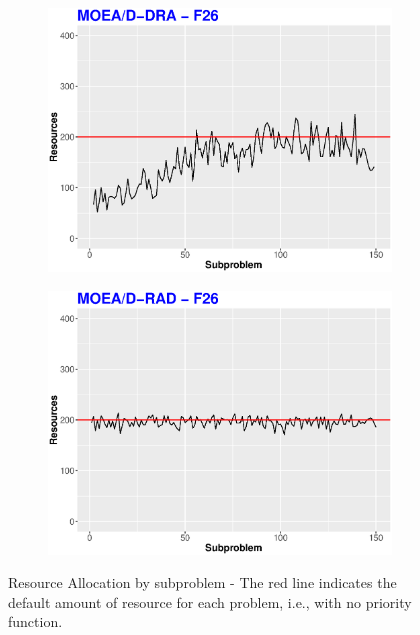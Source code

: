 \begin{figure}[!t]
	\centering
	\begin{subfigure}[b]{0.33\textwidth}
		\centering
		\includegraphics[width=1\textwidth, height=0.8\textwidth]{img/RA-DRA-26.eps}
	\end{subfigure}
	\begin{subfigure}[b]{0.33\textwidth}
		\centering
		\includegraphics[width=1\textwidth, height=0.8\textwidth]{img/RA-RAD-26.eps}
	\end{subfigure}
	\caption{Resource Allocation by subproblem - The red line indicates the default amount of resource for each problem, i.e., with no priority function.}
	\label{RAs1}
\end{figure}

